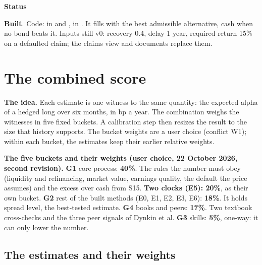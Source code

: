 \documentclass[11pt]{article}
\newcommand{\stbuilt}{\textcolor{good}{\textbf{Built}}}
\newcommand{\GA}{\textcolor{gA}{\textbf{G1}}}
\newcommand{\GB}{\textcolor{gB}{\textbf{G2}}}
\newcommand{\GC}{\textcolor{gC}{\textbf{G3}}}
\newcommand{\GD}{\textcolor{gD}{\textbf{G4}}}
\newcommand{\fld}[1]{\par\medskip\noindent\textbf{\textcolor{steel}{#1}}\par\nopagebreak}
\begin{document}
\fld{Status} \stbuilt. Code:  in  and ,  in . It fills  with the best admissible alternative, cash when no bond beats it. Inputs still v0: recovery 0.4, delay 1 year, required return 15\% on a defaulted claim; the claims view and documents replace them.
\newpage
\section{The combined score}\label{sec:score}

\textbf{The idea.} Each estimate is one witness to the same quantity: the expected alpha of a hedged long over six months, in bp a year. The combination weighs the witnesses in five fixed buckets. A calibration step then resizes the result to the size that history supports. The bucket weights are a user choice (conflict W1); within each bucket, the estimates keep their earlier relative weights.

\begin{notebox}
\textbf{The five buckets and their weights (user choice, 22 October 2026, second revision).}
\GA{} core process: \textbf{40\%}. The rules the number must obey (liquidity and refinancing, market value, earnings quality, the default the price assumes) and the excess over cash from S15.
\textbf{Two clocks (E5): 20\%}, as their own bucket.
\GB{} rest of the built methods (E0, E1, E2, E3, E6): \textbf{18\%}. It holds spread level, the best-tested estimate.
\GD{} books and peers: \textbf{17\%}. Two textbook cross-checks and the three peer signals of Dynkin et al.
\GC{} skills: \textbf{5\%}, one-way: it can only lower the number.
\end{notebox}

\subsection*{The estimates and their weights}
\end{document}
